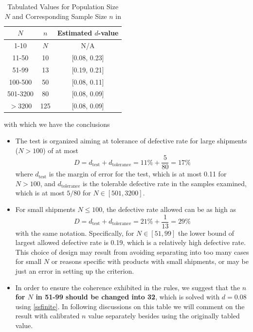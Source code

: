 \documentclass[12pt]{article}
\begin{document}
\begin{table}[htbp]
    \centering
    \begin{tabular}{ccc}
        \toprule
        $N$ & $n$ & Estimated $d$-value \\
        \midrule
        1-10 & $N$ & N/A \\
        11-50 & 10 & [0.08, 0.23] \\
        51-99 & 13 & [0.19, 0.21] \\
        100-500 & 50 & [0.08, 0.11]\\ 
        501-3200 & 80 & [0.08, 0.09]\\
        $>$3200 & 125 & [0.08, 0.09] \\
        \bottomrule
    \end{tabular}
    \caption{Tabulated Values for Population Size $N$ and Corresponding Sample Size $n$ in \cite{JJF2005}}
\end{table}

with which we have the conclusions

\begin{itemize}
    \item The test is organized aiming at tolerance of defective rate for large shipments ($N > 100$) of at most 
    $$
    D = d_{\text{test}} + d_{\text{tolerance}} = 11\% + \frac{5}{80} = 17\%
    $$
    where $d_{\text{test}}$ is the margin of error for the test, which is at most 0.11 for $N > 100$, and $d_{\text{tolerance}}$ is the tolerable defective rate in the samples examined, which is at most $5/80$ for $N\in[501, 3200]$. 
    \item For small shipments $N \leq 100$, the defective rate allowed can be as high as
    $$
    D = d_{\text{test}} + d_{\text{tolerance}} = 21\% + \frac{1}{13} = 29\%
    $$
    with the same notation. Specifically, for $N\in[51, 99]$ the lower bound of largest allowed defective rate is 0.19, which is a relatively high defective rate. This choice of design may result from avoiding separating into too many cases for small $N$ or reasons specific with products with small shipments, or may be just an error in setting up the criterion.
    \item In order to ensure the coherence exhibited in the rules, we suggest that the \textbf{$n$ for $N$ in 51-99 should be changed into 32}, which is solved with $d=0.08$ using \ref{ssfinite}. In following discussions on this table we will comment on the result with calibrated $n$ value separately besides using the originally tabled value. 
\end{itemize}
\end{document}
